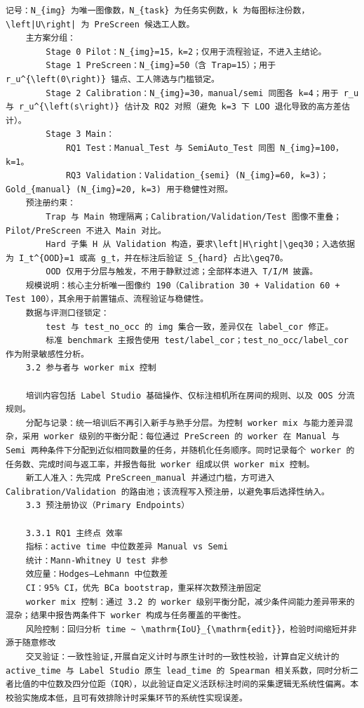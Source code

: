 \documentclass[a4paper,12pt]{article}
\begin{document}
\begin{Verbatim}[fontsize=\small,breaklines=true,breakanywhere=true]
	记号：N_{img} 为唯一图像数，N_{task} 为任务实例数，k 为每图标注份数，\left|U\right| 为 PreScreen 候选工人数。
	主方案分组：
		Stage 0 Pilot：N_{img}=15，k=2；仅用于流程验证，不进入主结论。
		Stage 1 PreScreen：N_{img}=50（含 Trap=15）；用于 r_u^{\left(0\right)} 锚点、工人筛选与门槛锁定。
		Stage 2 Calibration：N_{img}=30，manual/semi 同图各 k=4；用于 r_u 与 r_u^{\left(s\right)} 估计及 RQ2 对照（避免 k=3 下 LOO 退化导致的高方差估计）。
		Stage 3 Main：
			RQ1 Test：Manual_Test 与 SemiAuto_Test 同图 N_{img}=100，k=1。
			RQ3 Validation：Validation_{semi} (N_{img}=60, k=3)；Gold_{manual} (N_{img}=20, k=3) 用于稳健性对照。
	预注册约束：
		Trap 与 Main 物理隔离；Calibration/Validation/Test 图像不重叠；Pilot/PreScreen 不进入 Main 对比。
		Hard 子集 H 从 Validation 构造，要求\left|H\right|\geq30；入选依据为 I_t^{OOD}=1 或高 g_t，并在标注后验证 S_{hard} 占比\geq70。
		OOD 仅用于分层与触发，不用于静默过滤；全部样本进入 T/I/M 披露。
	规模说明：核心主分析唯一图像约 190（Calibration 30 + Validation 60 + Test 100），其余用于前置锚点、流程验证与稳健性。
	数据与评测口径锁定：
		test 与 test_no_occ 的 img 集合一致，差异仅在 label_cor 修正。
		标准 benchmark 主报告使用 test/label_cor；test_no_occ/label_cor 作为附录敏感性分析。
	3.2 参与者与 worker mix 控制

	培训内容包括 Label Studio 基础操作、仅标注相机所在房间的规则、以及 OOS 分流规则。
	分配与记录：统一培训后不再引入新手与熟手分层。为控制 worker mix 与能力差异混杂，采用 worker 级别的平衡分配：每位通过 PreScreen 的 worker 在 Manual 与 Semi 两种条件下分配到近似相同数量的任务，并随机化任务顺序。同时记录每个 worker 的任务数、完成时间与返工率，并报告每批 worker 组成以供 worker mix 控制。
	新工人准入：先完成 PreScreen_manual 并通过门槛，方可进入 Calibration/Validation 的路由池；该流程写入预注册，以避免事后选择性纳入。
	3.3 预注册协议（Primary Endpoints）

	3.3.1 RQ1 主终点 效率
	指标：active time 中位数差异 Manual vs Semi
	统计：Mann-Whitney U test 非参
	效应量：Hodges–Lehmann 中位数差
	CI：95% CI，优先 BCa bootstrap，重采样次数预注册固定
	worker mix 控制：通过 3.2 的 worker 级别平衡分配，减少条件间能力差异带来的混杂；结果中报告两条件下 worker 构成与任务覆盖的平衡性。
	风险控制：回归分析 time ~ \mathrm{IoU}_{\mathrm{edit}}，检验时间缩短并非源于随意修改
	交叉验证：一致性验证,开展自定义计时与原生计时的一致性校验，计算自定义统计的 active_time 与 Label Studio 原生 lead_time 的 Spearman 相关系数，同时分析二者比值的中位数及四分位距（IQR），以此验证自定义活跃标注时间的采集逻辑无系统性偏离。本校验实施成本低，且可有效排除计时采集环节的系统性实现误差。


\end{Verbatim}
\end{document}
